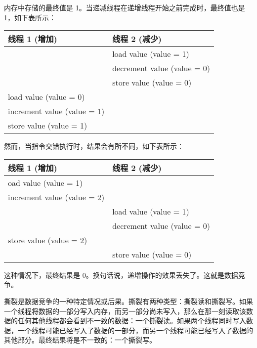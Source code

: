 内存中存储的最终值是 1。当递减线程在递增线程开始之前完成时，最终值也是 1，如下表所示：

\begin{longtable}{|l|l|}
\hline
\textbf{线程 1 (增加)} & \textbf{线程 2 (减少)} \\ \hline
\endfirsthead
%
\endhead
%
& load value (value = 1)        \\ \hline
& decrement value (value = 0)   \\ \hline
& store value (value = 0)       \\ \hline
load value (value = 0)        &                               \\ \hline
increment value (value = 1)   &                               \\ \hline
store value (value = 1)       &                               \\ \hline
\end{longtable}

然而，当指令交错执行时，结果会有所不同，如下表所示：

\begin{longtable}{|l|l|}
\hline
\textbf{线程 1 (增加)} & \textbf{线程 2 (减少)} \\ \hline
\endfirsthead
%
\endhead
%
oad value (value = 1)         &                               \\ \hline
increment value (value = 2)   &                               \\ \hline
& load value (value = 1)        \\ \hline
& decrement value (value = 0)   \\ \hline
store value (value = 2)       &                               \\ \hline
& store value (value = 0)       \\ \hline
\end{longtable}

这种情况下，最终结果是 0。换句话说，递增操作的效果丢失了。这就是数据竞争。


撕裂是数据竞争的一种特定情况或后果。撕裂有两种类型：撕裂读和撕裂写。如果一个线程将数据的一部分写入内存，而另一部分尚未写入，那么在那一刻读取该数据的任何其他线程都会看到不一致的数据：一个撕裂读。如果两个线程同时写入数据，一个线程可能已经写入了数据的一部分，而另一个线程可能已经写入了数据的其他部分。最终结果将是不一致的：一个撕裂写。

